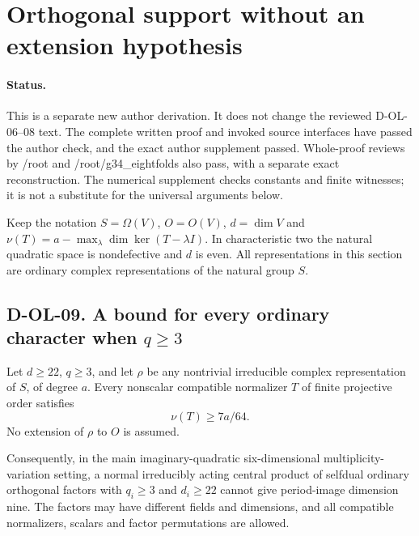 \section{Orthogonal support without an extension hypothesis}
\label{sec:orthogonal-nonextendible}

\paragraph{Status.}
This is a separate new author derivation.  It does not change the
reviewed D-OL-06--08 text.  The complete written proof and invoked
source interfaces have passed the author check, and the exact
author supplement passed. Whole-proof reviews by /root and
/root/g34\_eightfolds also pass, with a separate exact reconstruction.
The numerical supplement checks constants and finite witnesses;
it is not a substitute for the universal arguments below.

Keep the notation $S=\Omega(V)$, $O=O(V)$, $d=\dim V$ and
$\nu(T)=a-\max_\lambda\dim\ker(T-\lambda I)$.
In characteristic two the natural quadratic space is nondefective
and $d$ is even.  All representations in this section are ordinary
complex representations of the natural group $S$.

\subsection*{D-OL-09. A bound for every ordinary character when $q\ge3$}

\begin{theorem}[D-OL-09]
\label{D-OL-09}
Let $d\ge22$, $q\ge3$, and let $\rho$ be any nontrivial
irreducible complex representation of $S$, of degree $a$.
Every nonscalar compatible normalizer $T$ of finite projective
order satisfies
\[
                          \nu(T)\ge7a/64.                 \tag{ON.1}
\]
No extension of $\rho$ to $O$ is assumed.

Consequently, in the main imaginary-quadratic six-dimensional
multiplicity-variation setting, a normal irreducibly acting central
product of selfdual ordinary orthogonal factors with $q_i\ge3$
and $d_i\ge22$ cannot give period-image dimension nine.  The
factors may have different fields and dimensions, and all compatible
normalizers, scalars and factor permutations are allowed.
\end{theorem}

